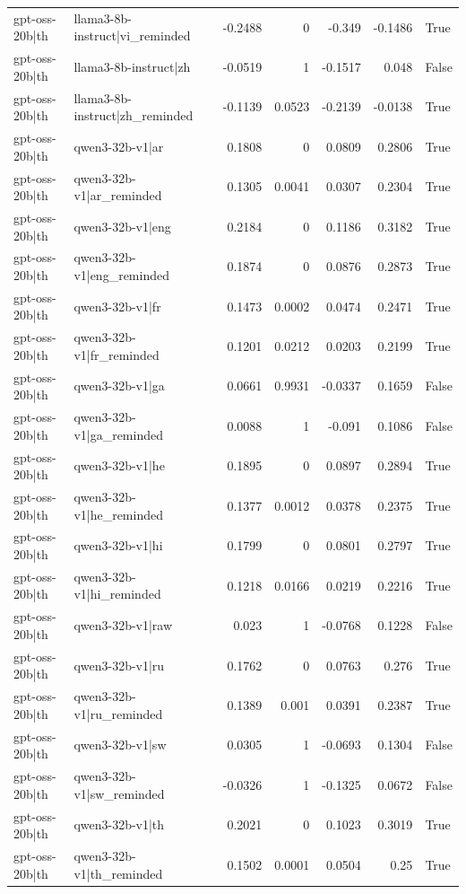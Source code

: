 \begin{table}
\begin{tabular}{l l r r r r l}
gpt-oss-20b|th & llama3-8b-instruct|vi_reminded & -0.2488 & 0 & -0.349 & -0.1486 & True \\
gpt-oss-20b|th & llama3-8b-instruct|zh & -0.0519 & 1 & -0.1517 & 0.048 & False \\
gpt-oss-20b|th & llama3-8b-instruct|zh_reminded & -0.1139 & 0.0523 & -0.2139 & -0.0138 & True \\
gpt-oss-20b|th & qwen3-32b-v1|ar & 0.1808 & 0 & 0.0809 & 0.2806 & True \\
gpt-oss-20b|th & qwen3-32b-v1|ar_reminded & 0.1305 & 0.0041 & 0.0307 & 0.2304 & True \\
gpt-oss-20b|th & qwen3-32b-v1|eng & 0.2184 & 0 & 0.1186 & 0.3182 & True \\
gpt-oss-20b|th & qwen3-32b-v1|eng_reminded & 0.1874 & 0 & 0.0876 & 0.2873 & True \\
gpt-oss-20b|th & qwen3-32b-v1|fr & 0.1473 & 0.0002 & 0.0474 & 0.2471 & True \\
gpt-oss-20b|th & qwen3-32b-v1|fr_reminded & 0.1201 & 0.0212 & 0.0203 & 0.2199 & True \\
gpt-oss-20b|th & qwen3-32b-v1|ga & 0.0661 & 0.9931 & -0.0337 & 0.1659 & False \\
gpt-oss-20b|th & qwen3-32b-v1|ga_reminded & 0.0088 & 1 & -0.091 & 0.1086 & False \\
gpt-oss-20b|th & qwen3-32b-v1|he & 0.1895 & 0 & 0.0897 & 0.2894 & True \\
gpt-oss-20b|th & qwen3-32b-v1|he_reminded & 0.1377 & 0.0012 & 0.0378 & 0.2375 & True \\
gpt-oss-20b|th & qwen3-32b-v1|hi & 0.1799 & 0 & 0.0801 & 0.2797 & True \\
gpt-oss-20b|th & qwen3-32b-v1|hi_reminded & 0.1218 & 0.0166 & 0.0219 & 0.2216 & True \\
gpt-oss-20b|th & qwen3-32b-v1|raw & 0.023 & 1 & -0.0768 & 0.1228 & False \\
gpt-oss-20b|th & qwen3-32b-v1|ru & 0.1762 & 0 & 0.0763 & 0.276 & True \\
gpt-oss-20b|th & qwen3-32b-v1|ru_reminded & 0.1389 & 0.001 & 0.0391 & 0.2387 & True \\
gpt-oss-20b|th & qwen3-32b-v1|sw & 0.0305 & 1 & -0.0693 & 0.1304 & False \\
gpt-oss-20b|th & qwen3-32b-v1|sw_reminded & -0.0326 & 1 & -0.1325 & 0.0672 & False \\
gpt-oss-20b|th & qwen3-32b-v1|th & 0.2021 & 0 & 0.1023 & 0.3019 & True \\
gpt-oss-20b|th & qwen3-32b-v1|th_reminded & 0.1502 & 0.0001 & 0.0504 & 0.25 & True \\

\end{tabular}
\end{table}
